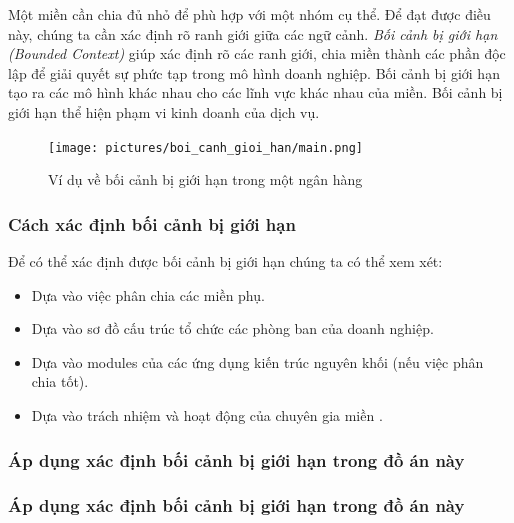 Một miền cần chia đủ nhỏ để phù hợp với một nhóm cụ thể. Để đạt được điều này, chúng ta cần xác định rõ ranh giới giữa các ngữ cảnh. \emph{Bối cảnh bị giới hạn (Bounded Context)} giúp xác định rõ các ranh giới, chia miền thành các phần độc lập để giải quyết sự phức tạp trong mô hình doanh nghiệp. Bối cảnh bị giới hạn tạo ra các mô hình khác nhau cho các lĩnh vực khác nhau của miền. Bối cảnh bị giới hạn thể hiện phạm vi kinh doanh của dịch vụ.

\begin{figure}[H]

    \centering

    \texttt{[image: pictures/boi\_canh\_gioi\_han/main.png]}

    \caption{Ví dụ về bối cảnh bị giới hạn trong một ngân hàng}

\end{figure}

\subsubsection{Cách xác định bối cảnh bị giới hạn}

Để có thể xác định được bối cảnh bị giới hạn chúng ta có thể xem xét:

\begin{itemize}

    \item Dựa vào việc phân chia các miền phụ.

    \item Dựa vào sơ đồ cấu trúc tổ chức các phòng ban của doanh nghiệp.

    \item Dựa vào modules của các ứng dụng kiến trúc nguyên khối (nếu việc phân chia tốt).

    \item Dựa vào trách nhiệm và hoạt động của chuyên gia  miền   .

\end{itemize}

\subsubsection{Áp dụng xác định bối cảnh bị giới hạn trong đồ án này}

\subsubsection{Áp dụng xác định bối cảnh bị giới hạn trong đồ án này}

